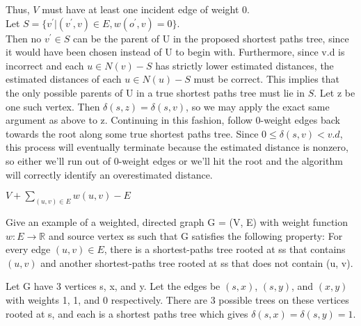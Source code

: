 \documentclass[a4paper, justified]{tufte-handout}
\begin{document}
\begin{solution}
	Thus, $V$ must have at least one incident edge of weight 0. \\
	Let $S = \{v^{'}|(v^{'},v)\in E,w(o^{'},v) = 0\}$.\\
	Then no $v^{'}\in S$ can be the parent of U in the proposed shortest paths tree, since it would have been chosen instead of U to begin with. Furthermore, since v.d is incorrect and each $u\in N(v)- S$ has strictly lower estimated distances, the estimated distances of each $u\in N(u)- S$ must be correct. This implies that the only possible parents
	of U in a true shortest paths tree must lie in $S$. Let z be one such vertex. Then $\delta (s,z)= \delta (s, v)$, so we may apply the exact same argument as above to z. Continuing in this fashion, follow 0-weight edges back towards the root along some true shortest paths tree. Since $0\leq \delta (s,v) < v.d$, this process will eventually terminate because the estimated distance is nonzero, so either we'll run out of 0-weight edges or we'll hit the root and the algorithm will correctly identify an overestimated distance.


\end{solution}


\begin{problem}[TC 24.3-7]
\end{problem}

\begin{solution}
	$V+\sum_{(u, v)\in E}w(u,v)-E$
\end{solution}

\begin{problem}[TC 24.5-2]
Give an example of a weighted, directed graph G = (V, E) with weight function $w: E \rightarrow \mathbb R$ and source vertex ss such that G satisfies the following property: For every edge $(u, v) \in E$, there is a shortest-paths tree rooted at ss that contains $(u, v)$ and another shortest-paths tree rooted at ss that does not contain (u, v).
\end{problem}

\begin{solution}
	Let G have 3 vertices s, x, and y. Let the edges be $(s, x)$, $(s, y)$, and $(x, y)$ with weights 1, 1, and 0 respectively. There are 3 possible trees on these vertices rooted at s, and each is a shortest paths tree which gives $\delta(s, x) = \delta(s, y) = 1$.
\end{solution}
\end{document}
